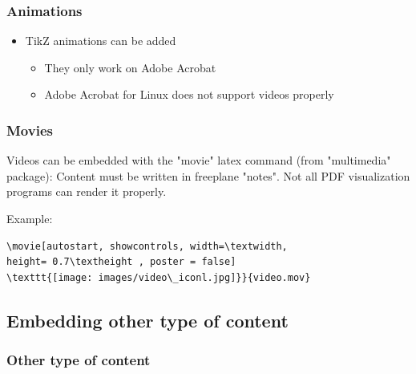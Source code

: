 \documentclass[usepdftitle=false,professionalfonts,compress ]{beamer}
\begin{document}
{
\begin{frame}\frametitle{Animations}
	\begin{itemize}

		\item TikZ animations can be added
		\begin{itemize}

			\item They only work on Adobe Acrobat
			\item Adobe Acrobat for Linux does not support videos properly
		\end{itemize}
	\end{itemize}

\end{frame}
}



{
\begin{frame}[fragile]\frametitle{Movies}

Videos can be embedded with the "movie" latex command (from "multimedia" package): Content must be written in freeplane "notes". Not all PDF visualization programs can render it properly.

Example:
\begin{verbatim}
\movie[autostart, showcontrols, width=\textwidth,
height= 0.7\textheight , poster = false]
\texttt{[image: images/video\_iconl.jpg]}}{video.mov}
\end{verbatim}




\end{frame}
}




\subsection{Embedding other type of content}

{
\begin{frame}\frametitle{Other type of content}

\end{frame}
}
\end{document}
